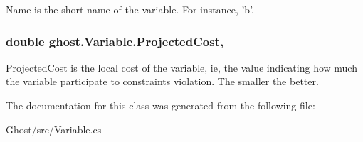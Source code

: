 Name is the short name of the variable. For instance, 'b'. \hypertarget{classghost_1_1Variable_a7c5bc50b854d25917ef641a2e965ea2a}{
\subsubsection[{Projected\-Cost}]{\setlength{\rightskip}{0pt plus 5cm}double ghost.\-Variable.\-Projected\-Cost\hspace{0.3cm}{\ttfamily [get]}, {\ttfamily [set]}}}\label{classghost_1_1Variable_a7c5bc50b854d25917ef641a2e965ea2a}
Projected\-Cost is the local cost of the variable, ie, the value indicating how much the variable participate to constraints violation. The smaller the better. 

The documentation for this class was generated from the following file\-:\begin{DoxyCompactItemize}
\item 
Ghost/src/Variable.\-cs\end{DoxyCompactItemize}
